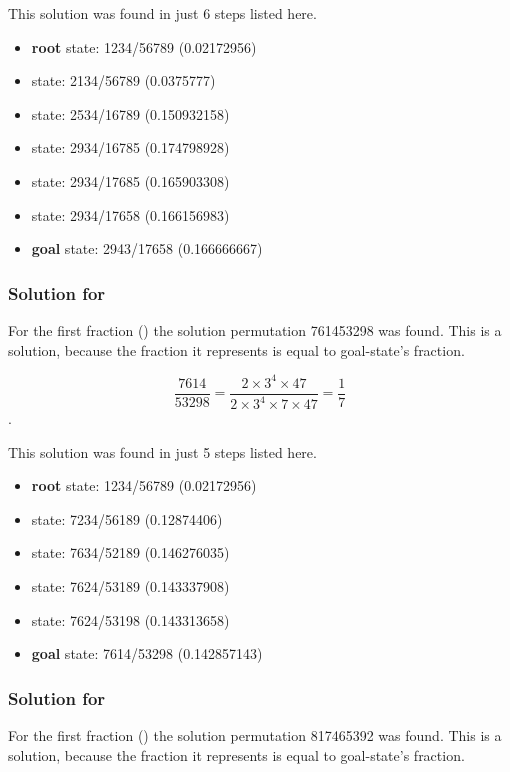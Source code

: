 \documentclass{article}
\begin{document}
This solution was found in just 6 steps listed here.

\begin{itemize}
  \item \textbf{root} state: 1234/56789 (0.02172956) 
  \item state: 2134/56789 (0.0375777)
  \item state: 2534/16789 (0.150932158)
  \item state: 2934/16785 (0.174798928)
  \item state: 2934/17685 (0.165903308)
  \item state: 2934/17658 (0.166156983)
  \item \textbf{goal} state: 2943/17658 (0.166666667)
\end{itemize}

\subsubsection{Solution for }

For the first fraction () the solution permutation 761453298 was
found. This is a solution, because the fraction it represents is equal to
goal-state's fraction.

\[\frac{7614}{53298} = \frac{2 \times 3^4 \times 47}{2 \times 3^4 \times 7
\times 47} = \frac{1}{7}\].

This solution was found in just 5 steps listed here.

\begin{itemize}
  \item \textbf{root} state: 1234/56789 (0.02172956) 
  \item state: 7234/56189 (0.12874406)
  \item state: 7634/52189 (0.146276035)
  \item state: 7624/53189 (0.143337908)
  \item state: 7624/53198 (0.143313658)
  \item \textbf{goal} state: 7614/53298 (0.142857143)
\end{itemize}

\subsubsection{Solution for }

For the first fraction () the solution permutation 817465392 was
found. This is a solution, because the fraction it represents is equal to
goal-state's fraction.
\end{document}
